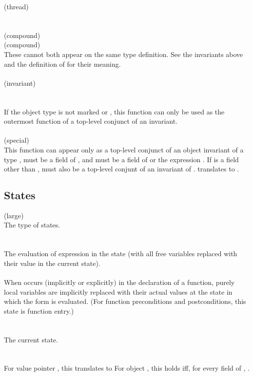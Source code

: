 \documentclass[preprint,nocopyrightspace]{sigplanconf}
\begin{document}
{{{ (thread)\\
\\\\
 (compound)\\
 (compound)\\
These cannot both appear on the same type definition. See the
invariants above and the definition of  for their meaning.
\\\\
\noindent{} (invariant)\\
\\\\
If the object type is not marked 
or , this function can only be used as the
outermost function of a top-level conjunct of an invariant.
\\\\
 (special)\\
This function can appear only as a top-level conjunct of an object
invariant of a type ,  must be a field of ,
and  must be a field of  or the expression 
\vcc{\this->\owner}. If  is a field other than \vcc{\owner}, 
 must also be a top-level conjunt of an invariant
of .  translates to
. 

\subsection{States}
\vcc{\state} (large)\\
The type of states. 
\\\\
\\
The evaluation of expression  in the state  (with all
free variables replaced with their value in the current state).  
\\\\
When \vcc{\at} occurs (implicitly or explicitly) in the declaration of
a function, purely local variables are implicitly replaced with their
actual values at the state in which the form is evaluated. (For
function preconditions and postconditions, this state is function entry.)
\\\\
\vcc{\state \now()}\\
The current state. 
\\\\
\\
For value pointer , this translates to  
For object , this holds iff, for every field 
of , .

}}}
\end{document}
